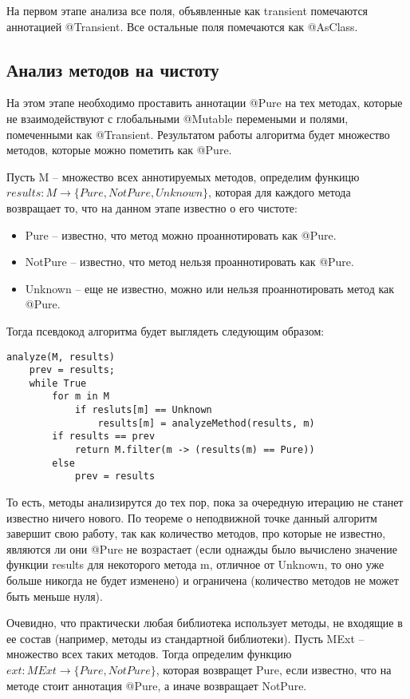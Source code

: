 На первом этапе анализа все поля, объявленные как transient помечаются аннотацией @Transient. Все остальные поля помечаются как @AsClass. 

\subsection{Анализ методов на чистоту}

На этом этапе необходимо проставить аннотации @Pure на тех методах, которые не взаимодействуют с глобальными @Mutable перемеными и полями, помеченными как @Transient. Результатом работы алгоритма будет множество методов, которые можно пометить как @Pure. 

Пусть M -- множество всех аннотируемых методов, определим функицю $results: M \rightarrow \{Pure, NotPure, Unknown\}$, которая для каждого метода возвращает то, что на данном этапе известно о его чистоте:
\begin{itemize}
\item Pure -- известно, что метод можно проаннотировать как @Pure.
\item NotPure -- известно, что метод нельзя проаннотировать как @Pure.
\item Unknown -- еще не известно, можно или нельзя проаннотировать метод как @Pure.
\end{itemize}

Тогда псевдокод алгоритма будет выглядеть следующим образом:

\begin{lstlisting}[caption=Анализ чистоты методов, label=code:purity]
analyze(M, results)
    prev = results;
    while True 
        for m in M 
            if resluts[m] == Unknown
                results[m] = analyzeMethod(results, m)
        if results == prev 
        	return M.filter(m -> (results(m) == Pure))        
        else 
            prev = results
\end{lstlisting}

То есть, методы анализирутся до тех пор, пока за очередную итерацию не станет известно ничего нового. По теореме о неподвижной точке данный алгоритм завершит свою работу, так как количество методов, про которые не известно, являются ли они @Pure не возрастает (если однажды было вычислено значение функции results для некоторого метода m, отличное от Unknown, то оно уже больше никогда не будет изменено) и ограничена (количество методов не может быть меньше нуля). 

Очевидно, что практически любая библиотека использует методы, не входящие в ее состав (например, методы из стандартной библиотеки). Пусть MExt -- множество всех таких методов. Тогда определим функцию \newline $ext: {MExt} \rightarrow \{Pure, NotPure\}$, которая возвращет Pure, если известно, что на методе стоит аннотация @Pure, а иначе возвращает NotPure. 

